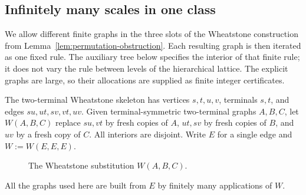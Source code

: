 
\subsection{Infinitely many scales in one class}\label{sec:incommensurate-family}\label{sec:transcendental-dependence}
We allow different finite graphs in the three slots of the Wheatstone construction from Lemma~\ref{lem:permutation-obstruction}. Each resulting graph is then iterated as one fixed rule. The auxiliary tree below specifies the interior of that finite rule; it does not vary the rule between levels of the hierarchical lattice. The explicit graphs are large, so their allocations are supplied as finite integer certificates.

\begin{definition}\label{def:wheatstone}
The two-terminal Wheatstone skeleton has vertices $s,t,u,v$, terminals $s,t$, and edges $su,ut,sv,vt,uv$. Given terminal-symmetric two-terminal graphs $A,B,C$, let $W(A,B,C)$ replace $su,vt$ by fresh copies of $A$, $ut,sv$ by fresh copies of $B$, and $uv$ by a fresh copy of $C$. All interiors are disjoint. Write $E$ for a single edge and $W:=W(E,E,E)$.
\end{definition}

\begin{figure}[tbp]
\centering
{}
\caption{The Wheatstone substitution $W(A,B,C)$.}
\label{fig:wheatstone}
\end{figure}


All the graphs used here are built from $E$ by finitely many applications of $W$.

